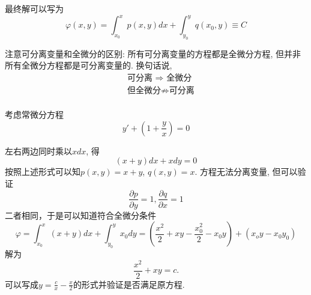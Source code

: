 
最终解可以写为
\begin{equation}
\varphi(x, y)=\int_{x_0}^x p(x, y) d x+\int_{y_0}^y q(x_0, y) \equiv C  
\end{equation}

注意可分离变量和全微分的区别: 所有可分离变量的方程都是全微分方程, 但并非所有全微分方程都是可分离变量的. 
换句话说,
$$
\begin{aligned}
    & \text { 可分离 } \Rightarrow \text { 全微分 } \\
    & \text { 但全微分} \nRightarrow \text{可分离} \\
\end{aligned}
$$

\begin{example}
    考虑常微分方程
$$
y'+\left(1+\frac{y}{x}\right)=0
$$
\end{example}

\begin{solution}
左右两边同时乘以$x dx$, 得
$$
(x+y) d x+x d y=0
$$
按照上述形式可以知$p(x,y) = x+y$, $q(x,y) = x$. 方程无法分离变量, 但可以验证
$$
\frac{\partial p}{\partial y}=1, \frac{\partial q}{\partial x}=1
$$
二者相同，于是可以知道符合全微分条件
$$
\varphi=\int_{x_0}^x(x+y) d x+\int_{y_0}^y x_0 d y=\left(\frac{x^2}{2}+x y-\frac{x_0^2}{2}-x_0 y\right)+\left(x_o y-x_0 y_0\right)
$$
解为 $$
\frac{x^2}{2}+x y=c.
$$
可以写成$ y = \frac{c}{x} - \frac{x}{2} $的形式并验证是否满足原方程.
\end{solution}



